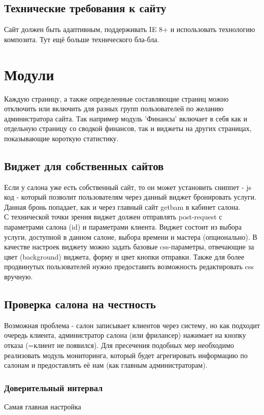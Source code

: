\documentclass[DIV=calc, paper=a4, fontsize=11pt]{scrartcl} %
\begin{document}
\subsection{Технические требования к сайту}
Сайт должен быть адаптивным, поддерживать IE 8+ и использовать технологию композита.
Тут ещё больше технического бла-бла.


\section{Модули}
Каждую страницу, а также определенные составляющие страниц можно отключить или включить для разных групп пользователей по желанию администратора сайта. Так например модуль 'Финансы' включает в себя как и отдельную страницу со сводкой финансов, так и виджеты на других страницах, показывающие короткую статистику.
\subsection{Виджет для собственных сайтов} \label{subsection:widget}
Если у салона уже есть собственный сайт, то он может установить сниппет - js код - который позволит пользователям через данный виджет бронировать услуги. Данная бронь попадает, как и через главный сайт getbam в кабинет салона.
\\[0.5cm]
С технической точки зрения виджет должен отправлять post-request с параметрами салона (id) и параметрами клиента. 
Виджет состоит из выбора услуги, доступной в данном салоне, выбора времени и мастера (опционально).
В качестве настроек виджету можно задать базовые css-параметры, отвечающие за цвет (background) виджета, форму и цвет кнопки отправки. Также для более продвинутых пользователей нужно предоставить возможность редактировать css вручную.

\subsection{Проверка салона на честность}
Возможная проблема - салон записывает клиентов через систему, но как подходит очередь клиента, администратор салона (или фрилансер) нажимает на кнопку отказа (=клиент не появился). Для пресечения подобных мер необходимо реализовать модуль мониторинга, который будет агрегировать информацию по салонам и предоставлять её нам (как главным администраторам).

\subsubsection{Доверительный интервал}
Самая главная настройка 
\end{document}
